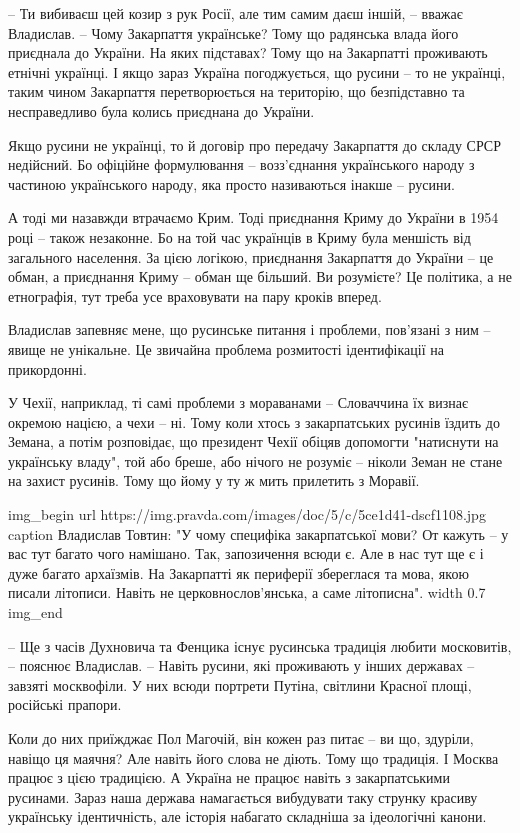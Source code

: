 – Ти вибиваєш цей козир з рук Росії, але тим самим даєш іншій, – вважає
Владислав. – Чому Закарпаття українське? Тому що радянська влада його приєднала
до України. На яких підставах? Тому що на Закарпатті проживають етнічні
українці. І якщо зараз Україна погоджується, що русини – то не українці, таким
чином Закарпаття перетворюється на територію, що безпідставно та несправедливо
була колись приєднана до України.

Якщо русини не українці, то й договір про передачу Закарпаття до складу СРСР
недійсний. Бо офіційне формулювання – возз'єднання українського народу з
частиною українського народу, яка просто називаються інакше – русини. 

А тоді ми назавжди втрачаємо Крим. Тоді приєднання Криму до України в 1954 році
– також незаконне. Бо на той час українців в Криму була меншість від загального
населення. За цією логікою, приєднання Закарпаття до України – це обман, а
приєднання Криму – обман ще більший. Ви розумієте? Це політика, а не
етнографія, тут треба усе враховувати на пару кроків вперед.

Владислав запевняє мене, що русинське питання і проблеми, пов’язані з ним –
явище не унікальне. Це звичайна проблема розмитості ідентифікації на
прикордонні.

У Чехії, наприклад, ті самі проблеми з мораванами – Словаччина їх визнає
окремою нацією, а чехи – ні. Тому коли хтось з закарпатських русинів їздить до
Земана, а потім розповідає, що президент Чехії обіцяв допомогти "натиснути на
українську владу", той або бреше, або нічого не розуміє – ніколи Земан не стане
на захист русинів. Тому що йому у ту ж мить прилетить з Моравії.

\ifcmt
img_begin 
        url https://img.pravda.com/images/doc/5/c/5ce1d41-dscf1108.jpg
        caption Владислав Товтин: "У чому специфіка закарпатської мови? От кажуть – у вас тут багато чого намішано. Так, запозичення всюди є. Але в нас тут ще є і дуже багато архаїзмів. На Закарпатті як периферії збереглася та мова, якою писали літописи. Навіть не церковнослов’янська, а саме літописна".
        width 0.7
img_end
\fi

– Ще з часів Духновича та Фенцика існує русинська традиція любити московитів, –
пояснює Владислав. – Навіть русини, які проживають у інших державах – завзяті
москвофіли. У них всюди портрети Путіна, світлини Красної площі, російські
прапори.

Коли до них приїжджає Пол Магочій, він кожен раз питає – ви що, здуріли, навіщо
ця маячня? Але навіть його слова не діють. Тому що традиція. І Москва працює з
цією традицією. А Україна не працює навіть з закарпатськими русинами. Зараз
наша держава намагається вибудувати таку струнку красиву українську
ідентичність, але історія набагато складніша за ідеологічні канони.

